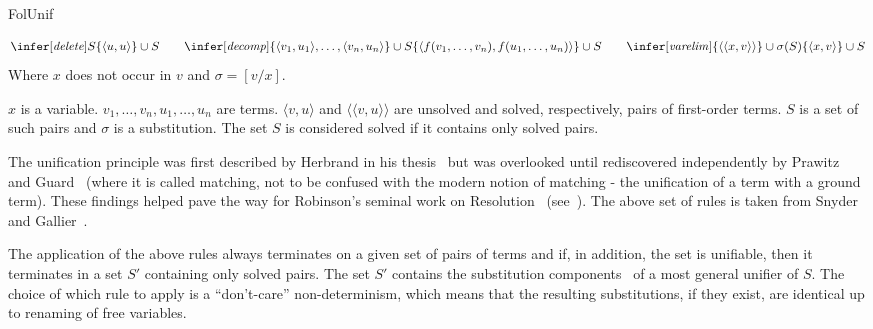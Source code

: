 \calculusAcronym{}



\maketitle

\begin{entry}{FolUnif}

\newcommand{\upair}[2]{\langle#1, #2\rangle}
\newcommand{\spair}[2]{\langle\langle#1, #2\rangle\rangle}

\begin{calculus}
\[
\infer[\mathit{delete}] {S}
                        {\{\upair u u\} \cup S}
\qquad
\infer[\mathit{decomp}] {\{\upair {v_1} {u_1} ,\ldots, \upair {v_n} {u_n}\}  \cup S}
                        {\{\upair {f(v_1,\ldots,v_n)} {f(u_1,\ldots,u_n)}\} \cup S}
\qquad
\infer[\mathit{varelim}]{\{\spair x v\} \cup \sigma(S)}
                        {\{\upair x v\} \cup S}
\]
Where $x$ does not occur in $v$ and $\sigma = [v/x]$.
\end{calculus}

\begin{clarifications}
  $x$ is a variable. $v_1,\ldots,v_n, u_1,\ldots, u_n$ are terms.  $\upair v u$
  and $\spair v u$ are unsolved and solved, respectively, pairs of first-order
  terms. $S$ is a set of such pairs and $\sigma$ is a substitution.
  The set $S$ is considered solved if it contains only solved pairs. 
\end{clarifications}

\begin{history}
   The unification principle was first described by Herbrand in his
   thesis~\cite{herbrand1930recherches} but was overlooked until rediscovered
   independently by Prawitz~\cite{Prawitz1960} and
   Guard~\cite{guard1964automated} (where it is called matching, not to be
   confused with the modern notion of matching - the unification of a term with
   a ground term).  These findings helped pave the way for Robinson's seminal
   work on Resolution~\cite{Robinson1965JACM} (see~).  The
   above set of rules is taken from Snyder and Gallier~\cite{Snyder1989101}.
\end{history}

\begin{technicalities}
   The application of the above rules always terminates on a given set of pairs
   of terms and if, in addition, the set is unifiable, then it terminates in a
   set $S'$ containing only solved pairs.  The set $S'$ contains the
   substitution components~\cite{Robinson1965JACM} of a most general unifier of
   $S$.  The choice of which rule to apply is a ``don't-care'' non-determinism,
   which means that the resulting substitutions, if they exist, are identical up
   to renaming of free variables.
\end{technicalities}


\end{entry}
